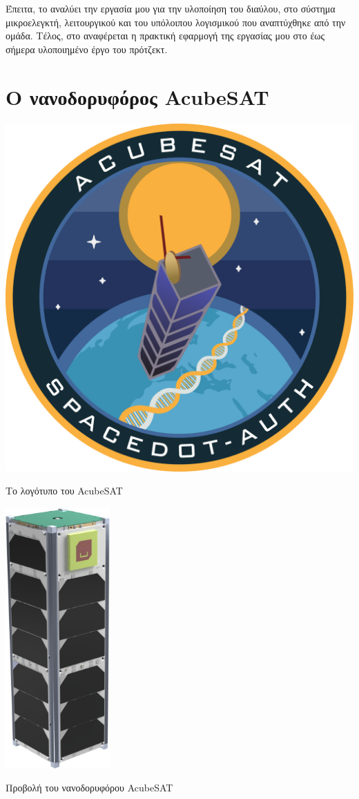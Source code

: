 \documentclass[a4paper,nobib,justified]{tufte-book}
\begin{document}
\par Έπειτα, το  αναλύει την εργασία μου για την υλοποίηση του διαύλου, στο σύστημα μικροελεγκτή, λειτουργικού και του υπόλοιπου λογισμικού που αναπτύχθηκε από την ομάδα. Τέλος, στο  αναφέρεται η πρακτική εφαρμογή της εργασίας μου στο έως σήμερα υλοποιημένο έργο του πρότζεκτ.

\chapter{Ο νανοδορυφόρος AcubeSAT}
\label{acubesat}

\begin{marginfigure}
	\centering
	\includegraphics{media/acubesat_patch.pdf}
	\caption{Το λογότυπο του AcubeSAT}
	\label{acubesat-logo}

	\includegraphics[height=10cm]{media/images/acubesat.png}
	\caption{Προβολή του νανοδορυφόρου AcubeSAT}
	\label{acubesat-render}
\end{marginfigure}
\end{document}
